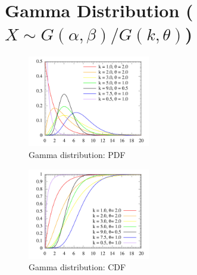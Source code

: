 \chapter{Gamma Distribution ($X \sim G(\alpha, \beta)/ G(k,\theta)$) \cite{ism-1,wiki/Gamma_distribution}}\label{Gamma Distribution}

\begin{table}[H]
    \begin{minipage}{0.49\linewidth}
        \begin{figure}[H]
            \centering
            \includegraphics[width=\linewidth, height=4cm, keepaspectratio]{Pictures/distributions/Gamma_distribution_pdf.jpg}
            \caption{Gamma distribution: PDF}
        \end{figure}
    \end{minipage}
    \hfill
    \begin{minipage}{0.49\linewidth}
        \begin{figure}[H]
            \centering
            \includegraphics[width=\linewidth, height=4cm, keepaspectratio]{Pictures/distributions/Gamma_distribution_cdf.jpg}
            \caption{Gamma distribution: CDF}
        \end{figure}
    \end{minipage}
\end{table}

